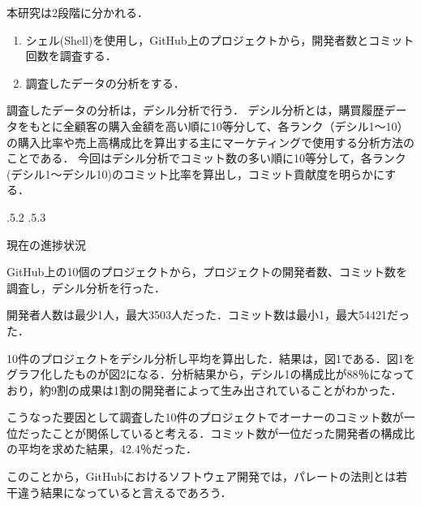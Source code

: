 \documentclass[uplatex]{jsarticle}
\makeatletter
\renewcommand{\section}{%
    \if@slide\clearpage\fi
    \@startsection{section}{1}{\z@}%
    {\Cvs \@plus.5\Cdp \@minus.2\Cdp}%
    {.5\Cvs \@plus.3\Cdp}%
    {\normalfont\raggedright}}
\makeatother
\begin{document}
本研究は2段階に分かれる．
\begin{enumerate}
\item シェル(Shell)を使用し，GitHub上のプロジェクトから，開発者数とコミット回数を調査する．
\item 調査したデータの分析をする．
\end{enumerate}


調査したデータの分析は，デシル分析で行う．
デシル分析とは，購買履歴データをもとに全顧客の購入金額を高い順に10等分して、各ランク（デシル1～10）の購入比率や売上高構成比を算出する主にマーケティングで使用する分析方法のことである\cite{decyl01}．
今回はデシル分析でコミット数の多い順に10等分して，各ランク(デシル1～デシル10)のコミット比率を算出し，コミット貢献度を明らかにする．



\section{現在の進捗状況}



GitHub上の10個のプロジェクトから，プロジェクトの開発者数、コミット数を調査し，デシル分析を行った．

開発者人数は最少1人，最大3503人だった．コミット数は最小1，最大54421だった．

10件のプロジェクトをデシル分析し平均を算出した．結果は，図1である．図1をグラフ化したものが図2になる．分析結果から，デシル1の構成比が88％になっており，約9割の成果は1割の開発者によって生み出されていることがわかった．

こうなった要因として調査した10件のプロジェクトでオーナーのコミット数が一位だったことが関係していると考える．コミット数が一位だった開発者の構成比の平均を求めた結果，42.4％だった．

このことから，GitHubにおけるソフトウェア開発では，パレートの法則とは若干違う結果になっていると言えるであろう．
\end{document}
